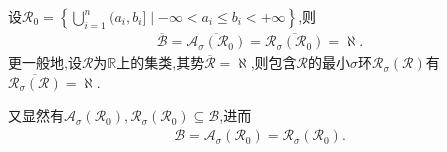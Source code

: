 \documentclass[../../main.tex]{subfiles}%
\begin{document}
\begin{theorem}\label{theorem:Borel集的势}
设$\mathscr{R}_0=\left\{\bigcup\limits_{i=1}^{n}(a_i,b_i]\mid -\infty<a_i\leqslant b_i<+\infty\right\}$,则
\begin{align*}
\overline{\mathscr{B}}=\overline{\mathscr{A}_{\sigma}(\mathscr{R}_0)}=\overline{\mathscr{R}_{\sigma}(\mathscr{R}_0)}=\aleph.
\end{align*}
更一般地,设$\mathscr{R}$为$\mathbb{R}$上的集类,其势$\overline{\mathscr{R}}=\aleph$,则包含$\mathscr{R}$的最小$\sigma$环$\mathscr{R}_{\sigma}(\mathscr{R})$有$\overline{\mathscr{R}_{\sigma}(\mathscr{R})}=\aleph$.

又显然有$\mathscr{A} _{\sigma}(\mathscr{R} _0),\mathscr{R} _{\sigma}(\mathscr{R} _0)\subseteq \mathscr{B}$,进而\begin{align*}
\mathscr{B} =\mathscr{A} _{\sigma}(\mathscr{R} _0)=\mathscr{R} _{\sigma}(\mathscr{R} _0).
\end{align*}
\end{theorem}
\end{document}
